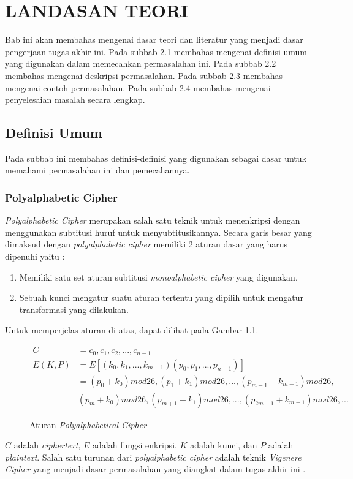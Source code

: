   \renewcommand{\theequation}{\arabic{chapter}.\arabic{equation}}
	\chapter{LANDASAN TEORI}
	Bab ini akan membahas mengenai dasar teori dan literatur yang menjadi dasar pengerjaan tugas akhir ini. Pada subbab 2.1 membahas mengenai definisi umum yang digunakan dalam memecahkan permasalahan ini. Pada subbab 2.2 membahas mengenai deskripsi permasalahan. Pada subbab 2.3 membahas mengenai contoh permasalahan. Pada subbab 2.4 membahas mengenai penyelesaian masalah secara lengkap.
	\section{Definisi Umum}
	Pada subbab ini membahas definisi-definisi yang digunakan sebagai dasar untuk memahami permasalahan ini dan pemecahannya.	
	\subsection{Polyalphabetic Cipher}
	\textit{Polyalphabetic Cipher }merupakan salah satu teknik untuk menenkripsi dengan menggunakan subtitusi huruf untuk menyubtitusikannya. Secara garis besar yang dimaksud dengan \textit{polyalphabetic cipher} memiliki 2 aturan dasar yang harus dipenuhi yaitu :
	\begin{enumerate}
		\item Memiliki satu set aturan subtitusi \textit{monoalphabetic cipher} yang digunakan.
		\item Sebuah kunci mengatur suatu aturan tertentu yang dipilih untuk mengatur transformasi yang dilakukan.
	\end{enumerate}
	Untuk memperjelas aturan di atas, dapat dilihat pada Gambar \ref{fig:polyalphabeticalcipher}.
	\begin{figure}[H]
		\centering
		\begin{align*}
 		C &=c_0,c_1,c_2,...,c_{n-1} \\
      	E(K,P)&=E[(k_0,k_1,...,k_{m-1})(p_0,p_1,...,p_{n-1})] \\
      	&=(p_0+k_0)mod26,(p_1+k_1)mod26,...,(p_{m-1}+k_{m-1})mod26, \\
      		&(p_m+k_0)mod26,(p_{m+1}+k_1)mod26,...,(p_{2m-1}+k_{m-1})mod26,...
		\end{align*}		
		
		\caption{Aturan \textit{Polyalphabetical Cipher}}
		\label{fig:polyalphabeticalcipher}
	\end{figure}
	$C$ adalah \textit{ciphertext}, $E$ adalah fungsi enkripsi, $K$ adalah kunci, dan $P$ adalah \textit{plaintext}.
	Salah satu turunan dari \textit{polyalphabetic cipher} adalah teknik \textit{Vigenere Cipher} yang menjadi dasar permasalahan yang diangkat dalam tugas akhir ini \cite{stallings_computer_2015}.
	
